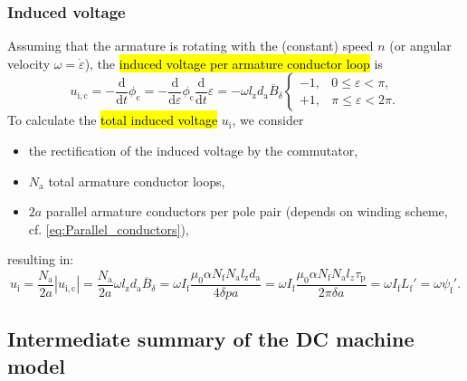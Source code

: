 \begin{frame}
	\frametitle{Induced voltage}
	Assuming that the armature is rotating with the (constant) speed $n$ (or angular velocity $\omega = \dot{\varepsilon}$), the \hl{induced voltage per armature conductor loop} is
	\begin{equation}
		u_\mathrm{i,c} = - \frac{\mathrm{d}}{\mathrm{d}t} \phi_\mathrm{c} = - \frac{\mathrm{d}}{\mathrm{d}\varepsilon} \phi_\mathrm{c} \frac{\mathrm{d}}{\mathrm{d}t}\varepsilon = - \omega l_\mathrm{z}d_\mathrm{a}\overline{B}_\delta \begin{cases}
			-1, & 0 \leq \varepsilon < \pi,    \\
			+1, & \pi \leq \varepsilon < 2\pi.
		\end{cases}
		\label{eq:Induced_voltage_per_conductor}
	\end{equation}
	To calculate the \hl{total induced voltage} $u_\mathrm{i}$, we consider
	\begin{itemize}
		\item the rectification of the induced voltage by the commutator, \pause
		\item $N_\mathrm{a}$ total armature conductor loops, \pause
		\item $2 a$ parallel armature conductors per pole pair (depends on winding scheme, cf. \eqref{eq:Parallel_conductors}), \pause
	\end{itemize}
	resulting in:
	\begin{equation}
		u_\mathrm{i} = \frac{N_\mathrm{a}}{2 a} |u_\mathrm{i,c}| = \frac{N_\mathrm{a}}{2 a}\omega l_\mathrm{z}d_\mathrm{a}\overline{B}_\delta = \omega I_\mathrm{f}\frac{\mu_0 \alpha N_\mathrm{f} N_\mathrm{a} l_\mathrm{z} d_\mathrm{a}}{4 \delta p a} =  \omega I_\mathrm{f} \frac{\mu_0 \alpha N_\mathrm{f} N_\mathrm{a} l_z \tau_\mathrm{p}}{2 \pi  \delta a} =\omega I_\mathrm{f} L_\mathrm{f}' = \omega  \psi_\mathrm{f}'.
	\end{equation}
\end{frame}

\subsection{Intermediate summary of the DC machine model}

